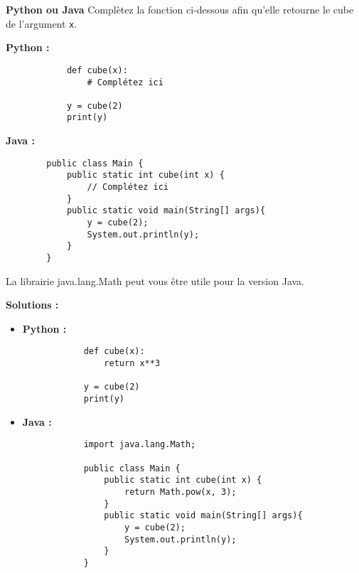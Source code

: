 \begin{Exercice}[5 minutes] \textbf{Python ou Java}
    Complètez la fonction ci-dessous afin qu'elle retourne le cube de l'argument \lstinline{x}.
    
    \textbf{Python :}
        \begin{verbatim}
            def cube(x):
                # Complétez ici
                
            y = cube(2)
            print(y)
        \end{verbatim}
        
    \textbf{Java :}
    \begin{verbatim}
        public class Main {
            public static int cube(int x) {
                // Complétez ici
            }
            public static void main(String[] args){
                y = cube(2);
                System.out.println(y);
            }
        }
    \end{verbatim}
    
    
    
    \begin{conseil}
        La librairie java.lang.Math peut vous être utile pour la version Java.
    \end{conseil}
    \textbf{Solutions :}
    \begin{itemize}
        \item \textbf{Python :}
        \begin{verbatim}
            def cube(x):
                return x**3
                
            y = cube(2)
            print(y)
        \end{verbatim}
        
        \item \textbf{Java :}
        \begin{verbatim}
            import java.lang.Math;
            
            public class Main {
                public static int cube(int x) {
                    return Math.pow(x, 3);
                }
                public static void main(String[] args){
                    y = cube(2);
                    System.out.println(y);
                }
            }
        \end{verbatim}
    \end{itemize}

\end{Exercice}

